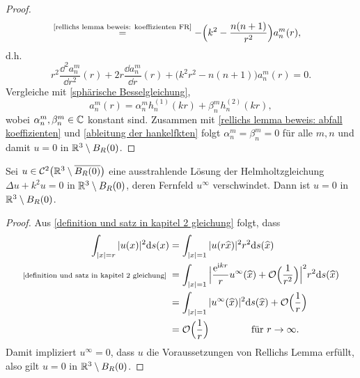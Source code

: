 \begin{proof}
\begin{align*}
		&\overset{\scriptsize\eqref{rellichs lemma beweis: koeffizienten FR}}{=}
		-\Big(k^2-\frac{n(n+1)}{r^2}\Big)a_n^m(r),
	\end{align*}
	d.h.
	\begin{equation*}
		r^2\frac{\dd^2a_n^m}{\dd r^2}(r)+2r\frac{\dd a_n^m}{\dd r}(r)+\big(k^2r^2-n(n+1)\big)a_n^m(r)=0.
	\end{equation*}
	Vergleiche mit \eqref{sphärische Besselgleichung},
	\begin{equation*}
		a_n^m(r)=\alpha_n^mh_n^{(1)}(kr) + \beta_n^mh_n^{(2)}(kr),
	\end{equation*}
	wobei \(\alpha_n^m,\beta_n^m\in\mathbb{C}\) konstant sind. Zusammen mit \eqref{rellichs lemma beweis: abfall koeffizienten} und \eqref{ableitung der hankelfkten} folgt \(\alpha_n^m=\beta_n^m=0\) für alle \(m,n\) und damit \(u=0\) in \(\mathbb{R}^3\setminus B_R(0)\).
\end{proof}
\begin{satz}
	Sei \(u\in\mathcal{C}^2\big(\mathbb{R}^3\setminus \overline{B_R(0)}\big)\) eine ausstrahlende Lösung der Helmholtzgleichung \(\Delta u+k^2u=0\) in \(\mathbb{R}^3\setminus B_R(0)\), deren Fernfeld \(u^\infty\) verschwindet. Dann ist \(u=0\) in \(\mathbb{R}^3\setminus B_R(0)\).
\end{satz}
\begin{proof}
	Aus \eqref{definition und satz in kapitel 2 gleichung} folgt, dass
	\begin{align*}
		\int_{|x|=r}|u(x)|^2\mathrm{d}s(x)&=\int_{|x|=1}|u(r\widehat{x})|^2r^2\mathrm{d}s(\widehat{x})\\
		\text{\scriptsize \eqref{definition und satz in kapitel 2 gleichung} }&=\int_{|x|=1}\Big|\frac{\mathrm{e}^{\mathrm{i} kr}}{r}u^\infty(\widehat{x})+\mathcal{O}\Big(\frac{1}{r^2}\Big)\Big|^2r^2\mathrm{d}s(\widehat{x})\\
		&=\int_{|x|=1}|u^\infty(\widehat{x})|^2\mathrm{d}s(\widehat{x})+\mathcal{O}\Big(\frac{1}{r}\Big)\\
		&=\mathcal{O}\Big(\frac{1}{r}\Big)\qquad\qquad\text{ für }r\to\infty.
	\end{align*}
	Damit impliziert \(u^\infty=0\), dass \(u\) die Voraussetzungen von Rellichs Lemma erfüllt, also gilt \(u=0\) in \(\mathbb{R}^3\setminus B_R(0)\).
\end{proof}
























